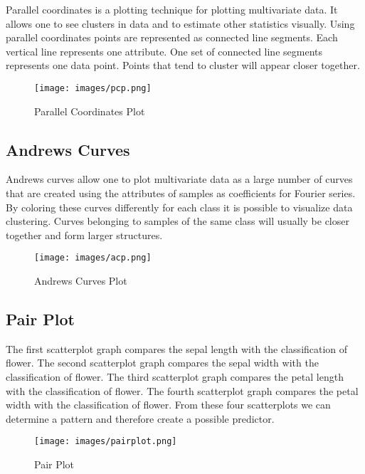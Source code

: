 \documentclass[11pt,letterpaper]{article}
\begin{document}
Parallel coordinates is a plotting technique for plotting multivariate data. It allows one to see clusters in data and to estimate other statistics visually. Using parallel coordinates points are represented as connected line segments. Each vertical line represents one attribute. One set of connected line segments represents one data point. Points that tend to cluster will appear closer together.


\begin{figure}[ht]
\centering
\label{fig:pcp}
\graphicspath{ {images/} }
\texttt{[image: images/pcp.png]}
\caption{Parallel Coordinates Plot}
\end{figure}

\subsection*{Andrews Curves }


 Andrews curves allow one to plot multivariate data as a large number of curves that are created using the attributes of samples as coefficients for Fourier series. By coloring these curves differently for each class it is possible to visualize data clustering. Curves belonging to samples of the same class will usually be closer together and form larger structures.

\begin{figure}[ht]
\centering
\label{fig:acp}
\graphicspath{ {images/} }
\texttt{[image: images/acp.png]}
\caption{Andrews Curves Plot}
\end{figure}



\subsection*{Pair Plot}


The first scatterplot graph compares the
sepal length with the classification of flower.
The second scatterplot graph compares
the sepal width with the classification of flower.
The third scatterplot graph compares the
petal length with the classification of flower. The fourth scatterplot graph compares the
petal width with the classification of flower.
From these four scatterplots we can determine a
pattern and therefore create a possible predictor. 

\begin{figure}[ht]
\centering
\label{fig:pairplot}
\graphicspath{ {images/} }
\texttt{[image: images/pairplot.png]}
\caption{Pair Plot}
\end{figure}
\end{document}
